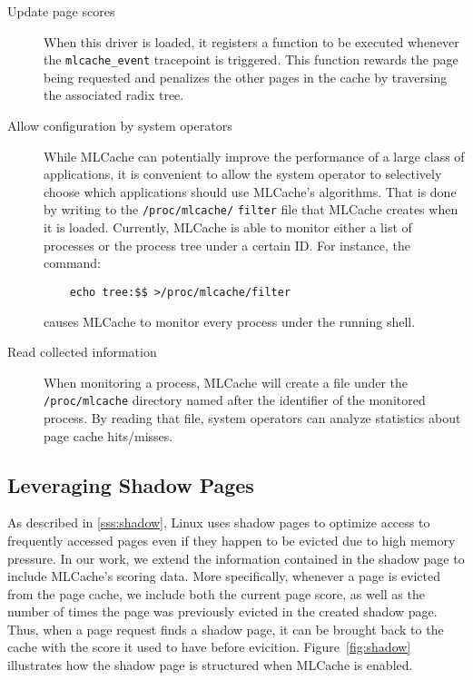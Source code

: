 \begin{description}
	\item[Update page scores] When this driver is loaded, it registers a function to be
	executed whenever the \texttt{mlcache\_event} tracepoint is triggered. This function
	rewards the page being requested and penalizes the other pages in the cache by
	traversing the associated radix tree.
	
	\item[Allow configuration by system operators] While
	MLCache can potentially improve the performance of a large class of applications,
	it is convenient to allow the system operator to selectively choose which applications
	should use MLCache's algorithms. That is done by writing to the \texttt{/proc/mlcache/}
	\texttt{filter}
	file that MLCache creates when it is loaded. Currently, MLCache is able to monitor either
	a list of processes or the process tree under a certain ID. For instance, the command:
	\begin{verbatim}
	echo tree:$$ >/proc/mlcache/filter
	\end{verbatim}
	causes MLCache to monitor every process
	under the running shell.
	
	\item[Read collected information] When monitoring a process, MLCache will create a file
	under the \texttt{/proc/mlcache} directory named after the identifier of the monitored process.
	By reading that file, system operators can analyze statistics about page cache hits/misses.
\end{description}

\subsection{Leveraging Shadow Pages}

As described in \ref{sss:shadow}, Linux uses shadow pages to optimize access to frequently accessed
pages even if they happen to be evicted due to high memory pressure. In our work, we extend the information
contained in the shadow page to include MLCache's scoring data. More specifically, whenever a page
is evicted from the page cache, we include both the current page score, as well as the number of times
the page was previously evicted in the created shadow page. Thus, when a page request finds a shadow
page, it can be brought back to the cache with the score it used to have before evicition. Figure~\ref{fig:shadow}
illustrates how the shadow page is structured when MLCache is enabled.

